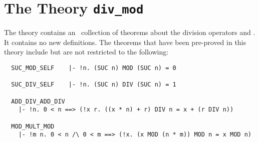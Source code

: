 \section{The Theory {\tt div\_mod}}

The theory 
contains an \adhoc\ collection of 
theorems about the division operators  and
. It contains no new definitions. 
The theorems that have been pre-proved in this theory include but are not
restricted to the following:


\begin{hol}
\begin{verbatim}
  SUC_MOD_SELF    |- !n. (SUC n) MOD (SUC n) = 0

  SUC_DIV_SELF    |- !n. (SUC n) DIV (SUC n) = 1

  ADD_DIV_ADD_DIV
    |- !n. 0 < n ==> (!x r. ((x * n) + r) DIV n = x + (r DIV n))

  MOD_MULT_MOD
    |- !m n. 0 < n /\ 0 < m ==> (!x. (x MOD (n * m)) MOD n = x MOD n)
\end{verbatim}\end{hol}
